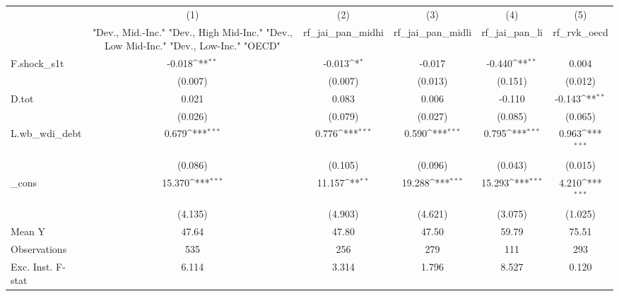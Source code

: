 {
\def\sym#1{\ifmmode^{#1}\else\(^{#1}\)\fi}
\begin{tabular}{l*{5}{c}}
\toprule
            &\multicolumn{1}{c}{(1)}&\multicolumn{1}{c}{(2)}&\multicolumn{1}{c}{(3)}&\multicolumn{1}{c}{(4)}&\multicolumn{1}{c}{(5)}\\
            &\multicolumn{1}{c}{ "Dev., Mid.-Inc." "Dev., High Mid-Inc." "Dev., Low Mid-Inc." "Dev., Low-Inc." "OECD" }&\multicolumn{1}{c}{rf\_jai\_pan\_midhi}&\multicolumn{1}{c}{rf\_jai\_pan\_midli}&\multicolumn{1}{c}{rf\_jai\_pan\_li}&\multicolumn{1}{c}{rf\_rvk\_oecd}\\
\midrule
F.shock\_s1t &      -0.018\sym{**} &      -0.013\sym{*}  &      -0.017         &      -0.440\sym{**} &       0.004         \\
            &     (0.007)         &     (0.007)         &     (0.013)         &     (0.151)         &     (0.012)         \\
\addlinespace
D.tot       &       0.021         &       0.083         &       0.006         &      -0.110         &      -0.143\sym{**} \\
            &     (0.026)         &     (0.079)         &     (0.027)         &     (0.085)         &     (0.065)         \\
\addlinespace
L.wb\_wdi\_debt&       0.679\sym{***}&       0.776\sym{***}&       0.590\sym{***}&       0.795\sym{***}&       0.963\sym{***}\\
            &     (0.086)         &     (0.105)         &     (0.096)         &     (0.043)         &     (0.015)         \\
\addlinespace
\_cons      &      15.370\sym{***}&      11.157\sym{**} &      19.288\sym{***}&      15.293\sym{***}&       4.210\sym{***}\\
            &     (4.135)         &     (4.903)         &     (4.621)         &     (3.075)         &     (1.025)         \\
\midrule
Mean Y      &       47.64         &       47.80         &       47.50         &       59.79         &       75.51         \\
Observations&         535         &         256         &         279         &         111         &         293         \\
Exc. Inst. F-stat&       6.114         &       3.314         &       1.796         &       8.527         &       0.120         \\
\bottomrule
\end{tabular}
}
